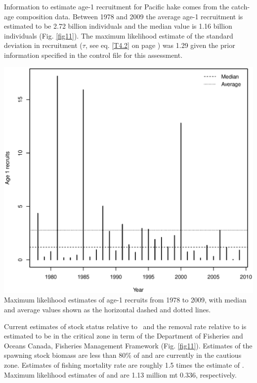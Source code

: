 \begin{multicols}{2}
Information to estimate age-1 recruitment for Pacific hake comes from the catch-age composition data.  Between 1978 and 2009 the average age-1 recruitment is estimated to be 2.72 billion individuals and the median value is 1.16 billion individuals (Fig. \ref{fig11}).  The maximum likelihood estimate of the standard deviation in recruitment ($\tau$, see eq. \ref{T4.2} on page \pageref{Table4}) was 1.29 given the prior information specified in the control file for this assessment.

\begin{figurehere}
	\centering
	\includegraphics[width=0.95\columnwidth]{iscamFigs/phakefig14.eps}\\
	\caption{Maximum likelihood estimates of age-1 recruits from 1978 to 2009, with median and average values shown as the horizontal dashed and dotted lines.}\label{fig10}
\end{figurehere}

Current estimates of stock status relative to \bmsy\ and the removal rate relative to \fmsy is estimated to be in the critical zone in term of the Department of Fisheries and Oceans Canada, Fisheries Management Framework (Fig. \ref{fig11}).  Estimates of the spawning stock biomass are less than 80\% of \bmsy and are currently in the cautious zone.  Estimates of fishing mortality rate are roughly 1.5 times the estimate of \fmsy.  Maximum likelihood estimates of \bmsy and \fmsy are 1.13 million mt 0.336, respectively. 


\end{multicols}
